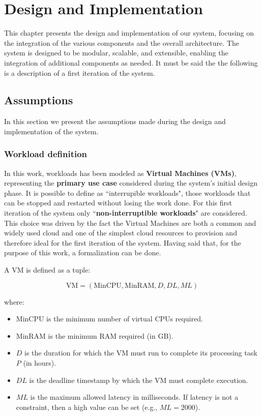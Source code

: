 \chapter{Design and Implementation}
\label{cha:design}

This chapter presents the design and implementation of our system, focusing on the integration of the various components and the overall architecture. The system is designed to be modular, scalable, and extensible, enabling the integration of additional components as needed.
It must be said the the following is a description of a first iteration of the system. 

\section{Assumptions}

In this section we present the assumptions made during the design and implementation of the system. 

\subsection{Workload definition}
In this work, workloads has been modeled as \textbf{Virtual Machines (VMs)}, representing the \textbf{primary use case} considered during the system's initial design phase. 
It is possible to define as ``interrupible workloads", those workloads that can be stopped and restarted without losing the work done. 
For this first iteration of the system only ``\textbf{non-interruptible workloads}" are considered.
This choice was driven by the fact the Virtual Machines are both a common and widely used cloud and one of the simplest cloud resources to provision and therefore ideal for the first iteration of the system.
Having said that, for the purpose of this work, a formalization can be done.

A VM is defined as a tuple:

\[
\text{VM} = (\text{MinCPU}, \text{MinRAM}, D, DL, ML)
\]

where:
\begin{itemize}[itemsep=0.2pt, topsep=1pt]
    \item \( \text{MinCPU} \) is the minimum number of virtual CPUs required.
    \item \( \text{MinRAM} \) is the minimum RAM required (in GB).
    \item \( D \) is the duration for which the VM must run to complete its processing task \( P \) (in hours).
    \item \( DL \) is the deadline timestamp by which the VM must complete execution.
    \item \( ML \) is the maximum allowed latency in milliseconds. If latency is not a constraint, then a high value can be set (e.g., \( ML = 2000 \)). \\
\end{itemize}

